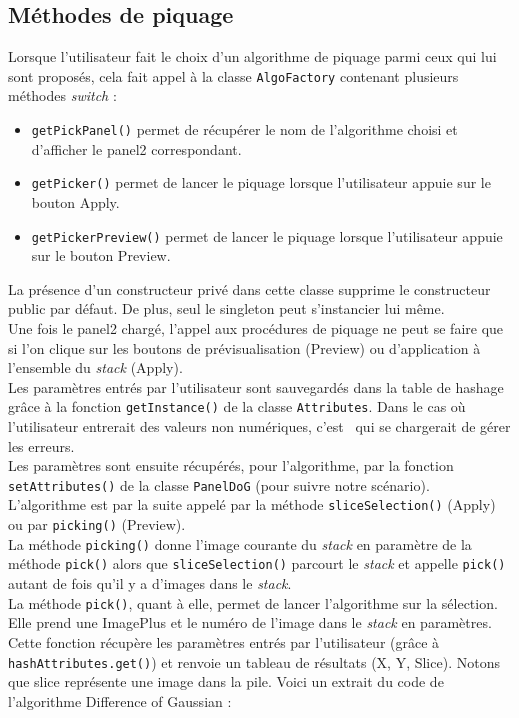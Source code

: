 \subsection{Méthodes de piquage}

Lorsque l'utilisateur fait le choix d'un algorithme de piquage parmi ceux qui lui sont proposés, cela fait appel à la classe \texttt{AlgoFactory} contenant plusieurs méthodes \emph{switch} :
\begin{itemize}
\item \texttt{getPickPanel()} permet de récupérer le nom de l'algorithme choisi et d'afficher le panel2 correspondant.
\item \texttt{getPicker()} permet de lancer le piquage lorsque l'utilisateur appuie sur le bouton Apply.
\item \texttt{getPickerPreview()} permet de lancer le piquage lorsque l'utilisateur appuie sur le bouton Preview.
\end{itemize}

La présence d'un constructeur privé dans cette classe supprime le constructeur public par défaut. De plus, seul le singleton peut s'instancier lui même. \\

Une fois le panel2 chargé, l'appel aux procédures de piquage ne peut se faire que si l'on clique sur les boutons de prévisualisation (Preview) ou d'application à l'ensemble du \textit{stack} (Apply). \\
Les paramètres entrés par l'utilisateur sont sauvegardés dans la table de hashage grâce à la fonction \texttt{getInstance()} de la classe \texttt{Attributes}. Dans le cas où l'utilisateur entrerait des valeurs non numériques, c'est \imj ~qui se chargerait de gérer les erreurs. \\
Les paramètres sont ensuite récupérés, pour l'algorithme, par la fonction \texttt{setAttributes()} de la classe \texttt{PanelDoG} (pour suivre notre scénario). \\
 L'algorithme est par la suite appelé par la méthode \texttt{sliceSelection()} (Apply) ou par \texttt{picking()} (Preview). \\

La méthode \texttt{picking()} donne l'image courante du \textit{stack} en paramètre de la méthode \texttt{pick()} alors que \texttt{sliceSelection()} parcourt le \textit{stack} et appelle \texttt{pick()} autant de fois qu'il y a d'images dans le \textit{stack}. \\

La méthode \texttt{pick()}, quant à elle, permet de lancer l'algorithme sur la sélection. Elle prend une ImagePlus et le numéro de l'image dans le \textit{stack} en paramètres. Cette fonction récupère les paramètres entrés par l'utilisateur (grâce à \texttt{hashAttributes.get()}) et renvoie un tableau de résultats (X, Y, Slice). Notons que slice représente une image dans la pile. Voici un extrait du code de l'algorithme Difference of Gaussian :

